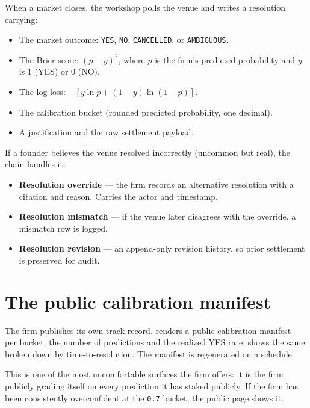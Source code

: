 \documentclass[11pt]{article}
\begin{document}
When a market closes, the workshop polls the venue and writes a
resolution carrying:

\begin{itemize}[leftmargin=*,itemsep=0.2em]
  \item The market outcome: \texttt{YES}, \texttt{NO},
        \texttt{CANCELLED}, or \texttt{AMBIGUOUS}.
  \item The Brier score: $(p - y)^2$, where $p$ is the firm's
        predicted probability and $y$ is 1 (YES) or 0 (NO).
  \item The log-loss: $-[y \ln p + (1-y) \ln(1-p)]$.
  \item The calibration bucket (rounded predicted probability, one
        decimal).
  \item A justification and the raw settlement payload.
\end{itemize}

If a founder believes the venue resolved incorrectly (uncommon but
real), the chain handles it:

\begin{itemize}[leftmargin=*,itemsep=0.2em]
  \item \textbf{Resolution override} --- the firm records an
        alternative resolution with a citation and reason. Carries the
        actor and timestamp.
  \item \textbf{Resolution mismatch} --- if the venue later disagrees
        with the override, a mismatch row is logged.
  \item \textbf{Resolution revision} --- an append-only revision
        history, so prior settlement is preserved for audit.
\end{itemize}

\section{The public calibration manifest}

The firm publishes its own track record.  renders
a public calibration manifest --- per bucket, the number of
predictions and the realized YES rate. 
shows the same broken down by time-to-resolution. The manifest is
regenerated on a schedule.

This is one of the most uncomfortable surfaces the firm offers: it is
the firm publicly grading itself on every prediction it has staked
publicly. If the firm has been consistently overconfident at the
\texttt{0.7} bucket, the public page shows it.
\end{document}
